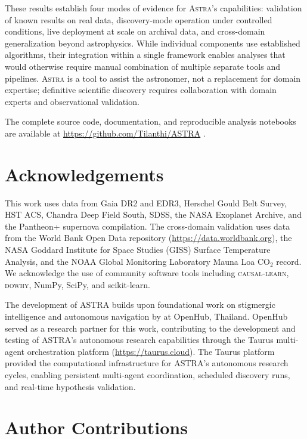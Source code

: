 \documentclass[usenatbib]{rasti}
\newcommand{\astra}{\textsc{Astra}\xspace}
\begin{document}
These results establish four modes of evidence for \astra's capabilities: validation of known results on real data, discovery-mode operation under controlled conditions, live deployment at scale on archival data, and cross-domain generalization beyond astrophysics.
While individual components use established algorithms, their integration within a single framework enables analyses that would otherwise require manual combination of multiple separate tools and pipelines.
\astra is a tool to assist the astronomer, not a replacement for domain expertise; definitive scientific discovery requires collaboration with domain experts and observational validation.

The complete source code, documentation, and reproducible analysis notebooks are available at \url{https://github.com/Tilanthi/ASTRA} \citep{White2026}.

\section*{Acknowledgements}

This work uses data from Gaia DR2 and EDR3, Herschel Gould Belt Survey, HST ACS, Chandra Deep Field South, SDSS, the NASA Exoplanet Archive, and the Pantheon+ supernova compilation.
The cross-domain validation uses data from the World Bank Open Data repository (\url{https://data.worldbank.org}), the NASA Goddard Institute for Space Studies (GISS) Surface Temperature Analysis, and the NOAA Global Monitoring Laboratory Mauna Loa CO$_{2}$ record.
We acknowledge the use of community software tools including \textsc{causal-learn}, \textsc{dowhy}, NumPy, SciPy, and scikit-learn.

The development of ASTRA builds upon foundational work on stigmergic intelligence and autonomous navigation by \citet{Dey2025} at OpenHub, Thailand.
OpenHub served as a research partner for this work, contributing to the development and testing of ASTRA's autonomous research capabilities through the Taurus multi-agent orchestration platform (\url{https://taurus.cloud}).
The Taurus platform provided the computational infrastructure for ASTRA's autonomous research cycles, enabling persistent multi-agent coordination, scheduled discovery runs, and real-time hypothesis validation.

\section*{Author Contributions}
\end{document}
